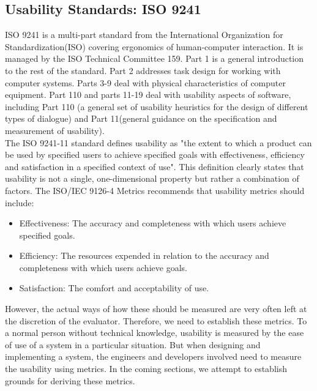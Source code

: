 \subsection{Usability Standards: ISO 9241}

ISO 9241 is a multi-part standard from the International Organization for Standardization(ISO) covering ergonomics of human-computer interaction. It is managed by the ISO Technical Committee 159. Part 1 is a general introduction to the rest of the standard. Part 2 addresses task design for working with computer systems. Parts 3-9 deal with physical characteristics of computer equipment. Part 110 and parts 11-19 deal with usability aspects of software, including Part 110 (a general set of usability heuristics for the design of different types of dialogue) and Part 11(general guidance on the specification and measurement of usability). \\

The ISO 9241-11 standard defines usability as "the extent to which a product can be used
by specified users to achieve specified goals with effectiveness, efficiency and satisfaction
in a specified context of use". This definition clearly states that usability is not a single,
one-dimensional property but rather a combination of factors.
The ISO/IEC 9126-4 Metrics recommends that usability metrics should include:
\begin{itemize}
\item Effectiveness: The accuracy and completeness with which users achieve specified
goals.

\item Efficiency: The resources expended in relation to the accuracy and completeness
with which users achieve goals.

\item Satisfaction: The comfort and acceptability of use.
\end{itemize}

However, the actual ways of how these should be measured are very often left at the
discretion of the evaluator. Therefore, we need to establish these metrics. To a normal
person without technical knowledge, usability is measured by the ease of use of a system in a
particular situation. But when designing and implementing a system, the engineers and
developers involved need to measure the usability using metrics. In the coming sections, we attempt to
establish grounds for deriving these metrics.

\medskip

